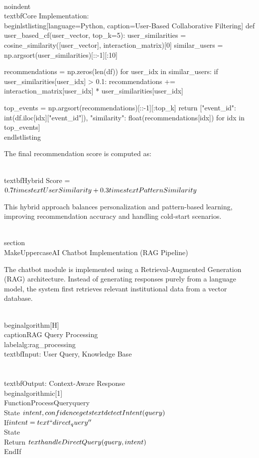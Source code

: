 \\noindent\\textbf{Core Implementation:}
\\begin{lstlisting}[language=Python, caption=User-Based Collaborative Filtering]
def user_based_cf(user_vector, top_k=5):
    user_similarities = cosine_similarity([user_vector], interaction_matrix)[0]
    similar_users = np.argsort(user_similarities)[::-1][:10]
    
    recommendations = np.zeros(len(df))
    for user_idx in similar_users:
        if user_similarities[user_idx] > 0.1:
            recommendations += interaction_matrix[user_idx] * user_similarities[user_idx]
    
    top_events = np.argsort(recommendations)[::-1][:top_k]
    return [{"event_id": int(df.iloc[idx]["event_id"]), 
             "similarity": float(recommendations[idx])} for idx in top_events]
\\end{lstlisting}

The final recommendation score is computed as:

\\textbf{Hybrid Score} = $0.7 \\times \\text{User Similarity} + 0.3 \\times \\text{Pattern Similarity}$

This hybrid approach balances personalization and pattern-based learning, improving recommendation accuracy and handling cold-start scenarios.

\\section{\\MakeUppercase{AI Chatbot Implementation (RAG Pipeline)}}

The chatbot module is implemented using a Retrieval-Augmented Generation (RAG) architecture. Instead of generating responses purely from a language model, the system first retrieves relevant institutional data from a vector database.

\\begin{algorithm}[H]
\\caption{RAG Query Processing}
\\label{alg:rag_processing}
\\textbf{Input:} User Query, Knowledge Base\\\\
\\textbf{Output:} Context-Aware Response
\\begin{algorithmic}[1]
\\Function{ProcessQuery}{query}
    \\State $intent, confidence \\gets \\text{detectIntent}(query)$
    \\If{$intent = \\text{``direct\\_query''}$}
        \\State \\Return $\\text{handleDirectQuery}(query, intent)$
    \\EndIf
    
